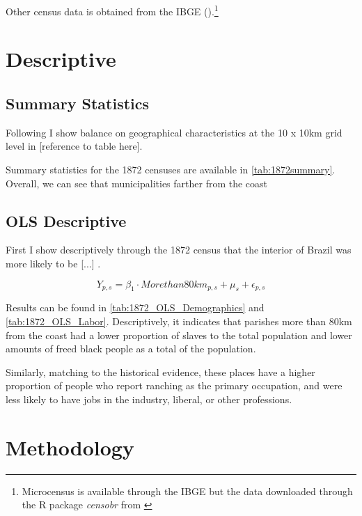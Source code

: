 \documentclass{article}
\begin{document}
Other census data is obtained from the IBGE (\textit{}).\footnote{Microcensus is available through the IBGE but the data downloaded through the R package \textit{censobr} from \textcite{Pereira2023-qv}}

\section{Descriptive}

\subsection{Summary Statistics}

Following \textcite{Lowes2021-ww} I show balance on geographical characteristics at the 10 x 10km grid level in [reference to table here].

Summary statistics for the 1872 censuses are available in \autoref{tab:1872summary}. Overall, we can see that municipalities farther from the coast 

\subsection{OLS Descriptive}

First I show descriptively through the 1872 census that the interior of Brazil was more likely to be [...] \parencite{Laudares2022-vy}.

\begin{equation}
  Y_{p,s} = \beta_1 \cdot Morethan80km_{p,s} + \mu_s + \epsilon_{p,s}
\end{equation}

Results can be found in \autoref{tab:1872_OLS_Demographics} and \autoref{tab:1872_OLS_Labor}. Descriptively, it indicates that parishes more than 80km from the coast had a lower proportion of slaves to the total population and lower amounts of freed black people as a total of the population.

Similarly, matching to the historical evidence, these places have a higher proportion of people who report ranching as the primary occupation, and were less likely to have jobs in the industry, liberal, or other professions. 

\section{Methodology}

\end{document}
